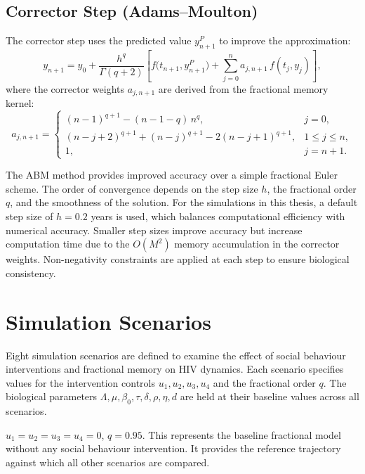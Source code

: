 \documentclass[12pt,a4paper,oneside]{report}
\begin{document}
\subsection{Corrector Step (Adams--Moulton)}
The corrector step uses the predicted value $y_{n+1}^{P}$ to improve the approximation:
\begin{equation}
y_{n+1}=y_0+\frac{h^q}{\Gamma(q+2)}\left[f\bigl(t_{n+1},y_{n+1}^{P}\bigr)+\sum_{j=0}^{n}a_{j,n+1}\,f(t_j,y_j)\right],
\label{eq:abm_corrector}
\end{equation}
where the corrector weights $a_{j,n+1}$ are derived from the fractional memory kernel:
\begin{equation}
a_{j,n+1}=
\begin{cases}
(n-1)^{q+1}-(n-1-q)\,n^q, & j=0,\\[4pt]
(n-j+2)^{q+1}+(n-j)^{q+1}-2(n-j+1)^{q+1}, & 1\leq j\leq n,\\[4pt]
1, & j=n+1.
\end{cases}
\label{eq:corrector_weights}
\end{equation}

\begin{remarkbox}[title={Numerical Accuracy Note}]
The ABM method provides improved accuracy over a simple fractional Euler scheme. The order of convergence depends on the step size $h$, the fractional order $q$, and the smoothness of the solution. For the simulations in this thesis, a default step size of $h=0.2$ years is used, which balances computational efficiency with numerical accuracy. Smaller step sizes improve accuracy but increase computation time due to the $O(M^2)$ memory accumulation in the corrector weights. Non-negativity constraints are applied at each step to ensure biological consistency.
\end{remarkbox}

\section{Simulation Scenarios}
Eight simulation scenarios are defined to examine the effect of social behaviour interventions and fractional memory on HIV dynamics. Each scenario specifies values for the intervention controls $u_1, u_2, u_3, u_4$ and the fractional order $q$. The biological parameters $\Lambda, \mu, \beta_0, \tau, \delta, \rho, \eta, d$ are held at their baseline values across all scenarios.

\begin{scenariobox}[title={Scenario 1 --- No Intervention}]
$u_1=u_2=u_3=u_4=0$, $q=0.95$. This represents the baseline fractional model without any social behaviour intervention. It provides the reference trajectory against which all other scenarios are compared.
\end{scenariobox}
\end{document}
